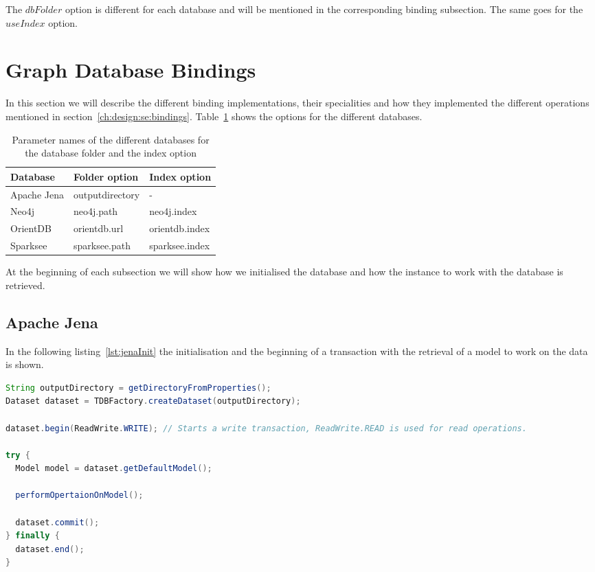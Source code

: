 The $ dbFolder $ option is different for each database and will be mentioned in the corresponding binding subsection.
The same goes for the $ useIndex $ option.

\section{Graph Database Bindings}
\label{ch:implementation:se:graphDatabaseBindings}
In this section we will describe the different binding implementations, their specialities and how they implemented the different operations mentioned in section~\ref{ch:design:se:bindings}.
Table~\ref{tab:bindingParameterMapping} shows the options for the different databases.

\begin{table}
  \begin{minipage}{\textwidth}
    \begin{tabularx}{\textwidth}{ | X | X | X | }
      \hline
      Database & Folder option & Index option \\ \hline \hline
      Apache Jena & outputdirectory & - \\ \hline
      Neo4j & neo4j.path & neo4j.index \\ \hline
      OrientDB & orientdb.url & orientdb.index \\ \hline
      Sparksee & sparksee.path & sparksee.index \\ \hline
    \end{tabularx}
  \end{minipage}
  \caption{Parameter names of the different databases for the database folder and the index option}
  \label{tab:bindingParameterMapping}
\end{table}

At the beginning of each subsection we will show how we initialised the database and how the instance to work with the database is retrieved.

\subsection{Apache Jena}
In the following listing~\ref{lst:jenaInit} the initialisation and the beginning of a transaction with the retrieval of a model to work on the data is shown.

\begin{lstlisting}[language=Java,label={lst:jenaInit},caption={Implementation of the initialisation and model retrieval in Jena.}]
String outputDirectory = getDirectoryFromProperties();
Dataset dataset = TDBFactory.createDataset(outputDirectory);

dataset.begin(ReadWrite.WRITE); // Starts a write transaction, ReadWrite.READ is used for read operations.

try {
  Model model = dataset.getDefaultModel();

  performOpertaionOnModel();

  dataset.commit();
} finally {
  dataset.end();
}
\end{lstlisting}

